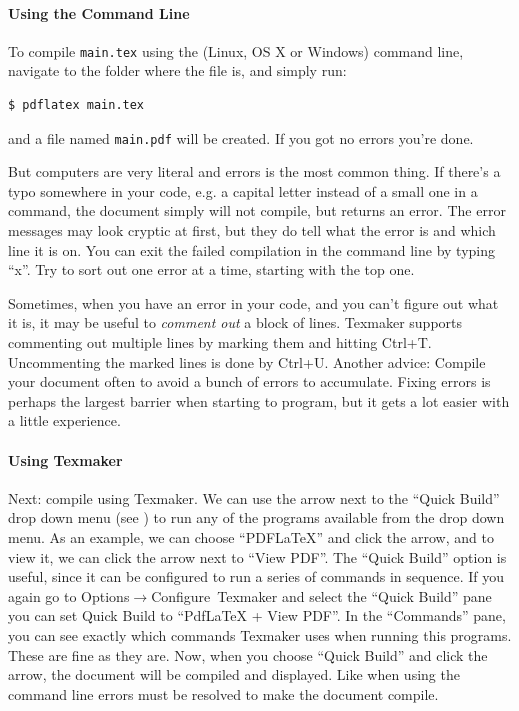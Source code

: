 \paragraph{Using the Command Line}
To compile \texttt{main.tex} using the (Linux, OS X or Windows) command line, navigate to the folder where the file is, and simply run:
\begin{verbatim}
$ pdflatex main.tex
\end{verbatim}
and a file named \verb|main.pdf| will be created. If you got no errors you're done.

But computers are very literal and errors is the most common thing. If there's a typo somewhere in your code, e.g. a capital letter instead of a small one in a command, the document simply will not compile, but returns an error. The error messages may look cryptic at first, but they do tell what the error is and which line it is on. You can exit the failed compilation in the command line by typing ``x''. Try to sort out one error at a time, starting with the top one.

Sometimes, when you have an error in your code, and you can't figure out what it is, it may be useful to \emph{comment out} a block of lines. Texmaker supports commenting out multiple lines by marking them and hitting Ctrl+T. Uncommenting the marked lines is done by Ctrl+U. Another advice: Compile your document often to avoid a bunch of errors to accumulate. Fixing errors is perhaps the largest barrier when starting to program, but it gets a lot easier with a little experience.

\paragraph{Using Texmaker}
Next: compile using Texmaker. We can use the arrow next to the ``Quick Build'' drop down menu (see ) to run any of the programs available from the drop down menu. As an example, we can choose ``PDFLaTeX'' and click the arrow, and to view it, we can click the arrow next to ``View PDF''. The ``Quick Build'' option is useful, since it can be configured to run a series of commands in sequence. If you again go to Options$\rightarrow$Configure~Texmaker and select the ``Quick Build'' pane you can set Quick Build to ``PdfLaTeX + View PDF''. In the ``Commands'' pane, you can see exactly which commands Texmaker uses when running this programs. These are fine as they are. Now, when you choose ``Quick Build'' and click the arrow, the document will be compiled and displayed. Like when using the command line errors must be resolved to make the document compile.

